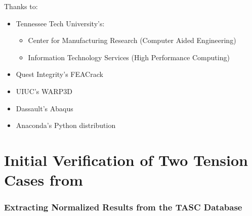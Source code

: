 \begin{frame}[plain]
\vfill
Thanks to:
\begin{itemize}
\item Tennessee Tech University's:
\begin{itemize}
\item Center for Manufacturing Research (Computer Aided Engineering)
\item Information Technology Services (High Performance Computing)
\end{itemize}
\item Quest Integrity's FEACrack
\item UIUC's WARP3D
\item Dassault's Abaqus
\item Anaconda's Python distribution
\end{itemize}
\vfill
{}
\end{frame}

\appendix


\part{Initial Verification of Two Tension Cases from \citet{allenwells2014}}

\section{Extracting Normalized Results from the TASC Database}


